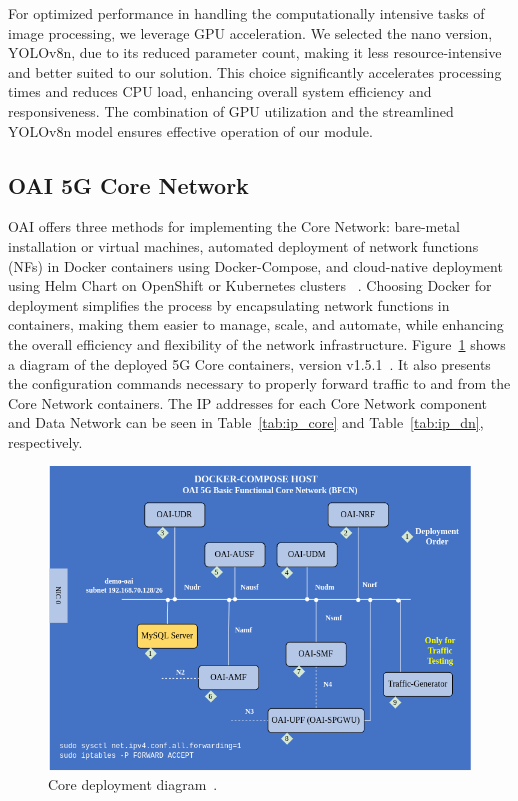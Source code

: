For optimized performance in handling the computationally intensive tasks of image processing, we leverage GPU acceleration.
We selected the nano version, YOLOv8n, due to its reduced parameter count, making it less resource-intensive and better suited to our solution.
This choice significantly accelerates processing times and reduces CPU load, enhancing overall system efficiency and responsiveness.
The combination of GPU utilization and the streamlined YOLOv8n model ensures effective operation of our module.



\subsection{OAI 5G Core Network}\label{subsec:oai-5g-core-network}
OAI offers three methods for implementing the Core Network: bare-metal installation or virtual machines, automated deployment of network functions (NFs) in Docker containers using Docker-Compose, and cloud-native deployment using Helm Chart on OpenShift or Kubernetes clusters ~\cite{oai5gcore}.
Choosing Docker for deployment simplifies the process by encapsulating network functions in containers, making them easier to manage, scale, and automate, while enhancing the overall efficiency and flexibility of the network infrastructure.
Figure~\ref{fig:core_depl} shows a diagram of the deployed 5G Core containers, version v1.5.1~\cite{oai-cn5g-fed-v1.5.1}.
It also presents the configuration commands necessary to properly forward traffic to and from the Core Network containers.
The IP addresses for each Core Network component and Data Network can be seen in Table~\ref{tab:ip_core} and Table~\ref{tab:ip_dn}, respectively.


\begin{figure}[H]
    \centering
    \includegraphics[width=0.7\linewidth]{figures/core_deply}
    \caption{Core deployment diagram~\cite{oai_cn5g_fed_deploy}.}
    \label{fig:core_depl}
\end{figure}


